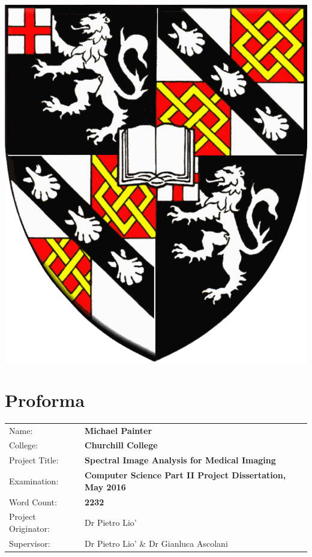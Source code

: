 \documentclass[12pt,twoside,notitlepage]{report}
\begin{document}
\begin{center}
    \includegraphics[scale=0.2792]{titleimg/chucrest}

    \vfill
\end{center}






\cleardoublepage

\setcounter{page}{1}
\pagestyle{plain}

\chapter*{Proforma}

{\large
\begin{tabularx}{\textwidth}{l X}
Name:               & \bf Michael Painter                      \\
College:            & \bf Churchill College                     \\
Project Title:      & \bf Spectral Image Analysis for Medical Imaging \\
Examination:        & \bf Computer Science Part II Project Dissertation, May 2016        \\
Word Count:         & \bf 2232\footnotemark[1]\\
Project Originator: & Dr Pietro Lio'              \\
Supervisor:         & Dr Pietro Lio' \& Dr Gianluca Ascolani       \\ 
\end{tabularx}
}
\end{document}
